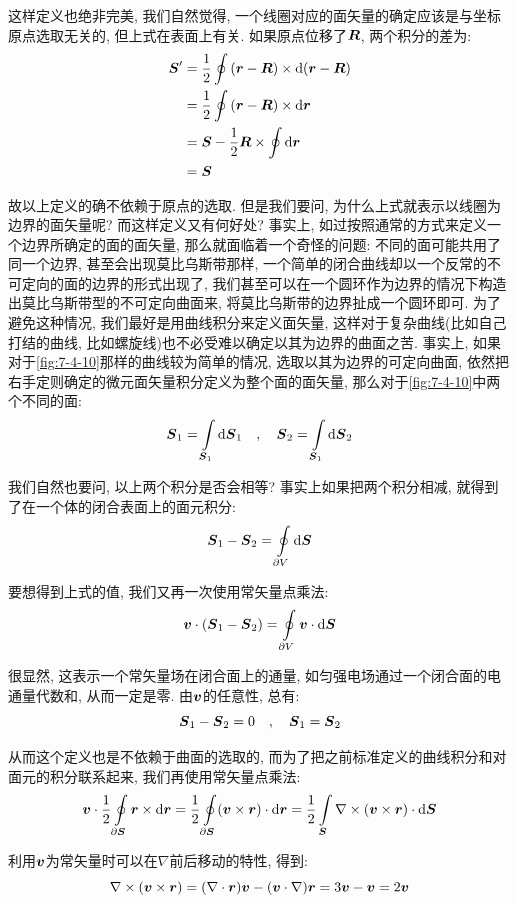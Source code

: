 这样定义也绝非完美, 我们自然觉得, 一个线圈对应的面矢量的确定应该是与坐标原点选取无关的, 但上式在表面上有关. 如果原点位移了$\boldsymbol{R}$, 两个积分的差为:
\begin{align*}
\boldsymbol{S}'	&=\frac{1}{2}\oint\left(\boldsymbol{r}-\boldsymbol{R}\right)\times \textrm{d} (\boldsymbol{r}-\boldsymbol{R})\\
			&=\frac{1}{2}\oint\left(\boldsymbol{r}-\boldsymbol{R}\right)\times \textrm{d} \boldsymbol{r}\\
			&=\boldsymbol{S}-\frac{1}{2}\boldsymbol{R}\times\oint\textrm{d} \boldsymbol{r}\\
			&=\boldsymbol{S}
\end{align*}
	
故以上定义的确不依赖于原点的选取. 但是我们要问, 为什么上式就表示以线圈为边界的面矢量呢? 而这样定义又有何好处? 事实上, 如过按照通常的方式来定义一个边界所确定的面的面矢量, 那么就面临着一个奇怪的问题: 不同的面可能共用了同一个边界, 甚至会出现莫比乌斯带那样, 一个简单的闭合曲线却以一个反常的不可定向的面的边界的形式出现了, 我们甚至可以在一个圆环作为边界的情况下构造出莫比乌斯带型的不可定向曲面来, 将莫比乌斯带的边界扯成一个圆环即可. 为了避免这种情况, 我们最好是用曲线积分来定义面矢量, 这样对于复杂曲线(比如自己打结的曲线, 比如螺旋线)也不必受难以确定以其为边界的曲面之苦. 事实上, 如果对于\ref{fig:7-4-10}那样的曲线较为简单的情况, 选取以其为边界的可定向曲面, 依然把右手定则确定的微元面矢量积分定义为整个面的面矢量, 那么对于\ref{fig:7-4-10}中两个不同的面:
\[\boldsymbol{S}_1=\int\limits_{\boldsymbol{S}_1}\textrm{d} \boldsymbol{S}_1\quad ,\quad \boldsymbol{S}_2=\int\limits_{\boldsymbol{S}_1}\textrm{d} \boldsymbol{S}_2\]


我们自然也要问, 以上两个积分是否会相等? 事实上如果把两个积分相减, 就得到了在一个体的闭合表面上的面元积分:
\[\boldsymbol{S}_1-\boldsymbol{S}_2=\oint\limits_{\partial V}\textrm{d}\boldsymbol{S}\]

要想得到上式的值, 我们又再一次使用常矢量点乘法:
\[\boldsymbol{v}\cdot(\boldsymbol{S}_1-\boldsymbol{S}_2)=\oint\limits_{\partial V}\boldsymbol{v}\cdot\textrm{d}\boldsymbol{S}\]

很显然, 这表示一个常矢量场在闭合面上的通量, 如匀强电场通过一个闭合面的电通量代数和, 从而一定是零. 由$\boldsymbol{v}$的任意性, 总有:
\[\boldsymbol{S}_1-\boldsymbol{S}_2=0\quad ,\quad \boldsymbol{S}_1=\boldsymbol{S}_2\]

从而这个定义也是不依赖于曲面的选取的, 而为了把之前标准定义的曲线积分和对面元的积分联系起来, 我们再使用常矢量点乘法:
\[\boldsymbol{v}\cdot\frac{1}{2}\oint\limits_{\partial\boldsymbol{S}}\boldsymbol{r}\times \textrm{d} \boldsymbol{r}=\frac{1}{2}\oint\limits_{\partial \boldsymbol{S}}(\boldsymbol{v}\times\boldsymbol{r}) \cdot \textrm{d} \boldsymbol{r}=\frac{1}{2}\int\limits_{\boldsymbol{S}}\nabla\times(\boldsymbol{v}\times\boldsymbol{r}) \cdot \textrm{d} \boldsymbol{S}\]

利用$\boldsymbol{v}$为常矢量时可以在$\nabla$前后移动的特性, 得到:
\[\nabla\times(\boldsymbol{v}\times\boldsymbol{r})=(\nabla\cdot \boldsymbol{r})\boldsymbol{v}-(\boldsymbol{v}\cdot\nabla)\boldsymbol{r}=3\boldsymbol{v}-\boldsymbol{v}=2\boldsymbol{v}\]

